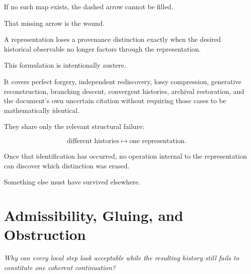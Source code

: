 \documentclass[
  11pt,
  a4paper,
  DIV=12,
  BCOR=0mm,
  parskip=half-
]{scrartcl}
\theoremstyle{definition}
\theoremstyle{plain}
\theoremstyle{remark}
\newcommand{\movementquestion}[1]{%
  \begin{center}
    \small\itshape
    #1
  \end{center}
  \medskip
}
\begin{document}
If no such map exists, the dashed arrow cannot be filled.

That missing arrow is the wound.

\begin{held}
\centering
A representation loses a provenance distinction exactly when the desired
historical observable no longer factors through the representation.
\end{held}

This formulation is intentionally austere.

It covers perfect forgery, independent rediscovery, lossy compression,
generative reconstruction, branching descent, convergent histories, archival
restoration, and the document's own uncertain citation without requiring those
cases to be mathematically identical.

They share only the relevant structural failure:

\[
  \text{different histories}
  \longmapsto
  \text{one representation}.
\]

Once that identification has occurred, no operation internal to the
representation can discover which distinction was erased.

Something else must have survived elsewhere.


\section{Admissibility, Gluing, and Obstruction}
\label{app:admissibility}

\movementquestion{Why can every local step look acceptable while the resulting history still fails to constitute one coherent continuation?}
\end{document}
